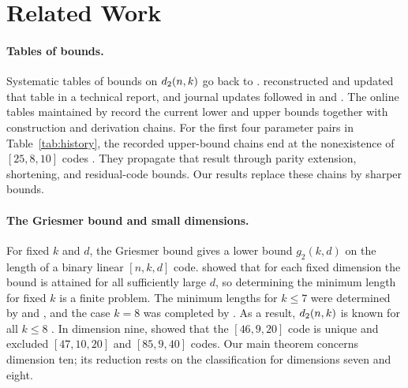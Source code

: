 \section{Related Work}\label{sec:related}
\paragraph{Tables of bounds.}
Systematic tables of bounds on $d_2(n,k)$ go back to \citet{helgert1973}. \citet{verhoeff1985} reconstructed and updated that table in a technical report, and journal updates followed in \citet{verhoeff1987} and \citet{brouwer1993}. The online tables maintained by \citet{grasslTables} record the current lower and upper bounds together with construction and derivation chains. For the first four parameter pairs in Table~\ref{tab:history}, the recorded upper-bound chains end at the nonexistence of $[25,8,10]$ codes \citep{ytrehus1990}. They propagate that result through parity extension, shortening, and residual-code bounds. Our results replace these chains by sharper bounds.

\paragraph{The Griesmer bound and small dimensions.}
For fixed $k$ and $d$, the Griesmer bound \citep{griesmer1960} gives a lower bound $g_2(k,d)$ on the length of a binary linear $[n,k,d]$ code. \citet{baumert1973} showed that for each fixed dimension the bound is attained for all sufficiently large $d$, so determining the minimum length for fixed $k$ is a finite problem. The minimum lengths for $k\le7$ were determined by \citet{baumert1973} and \citet{vantilborg1981}, and the case $k=8$ was completed by \citet{bouyukliev2000}. As a result, $d_2(n,k)$ is known for all $k\le8$ \citep{kurz2021}. In dimension nine, \citet{kurz2021} showed that the $[46,9,20]$ code is unique and excluded $[47,10,20]$ and $[85,9,40]$ codes. Our main theorem concerns dimension ten; its reduction rests on the classification for dimensions seven and eight.

